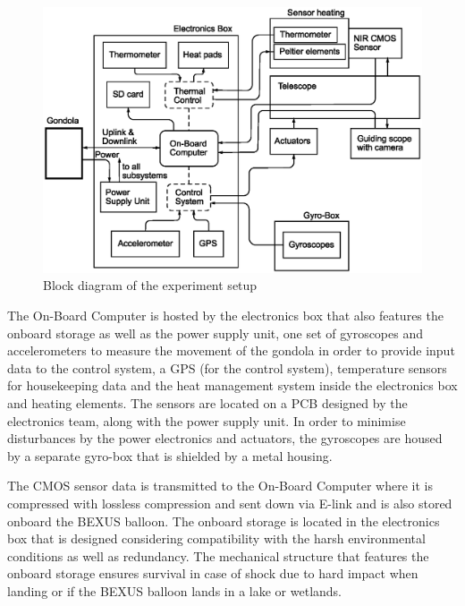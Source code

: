 \begin{figure}[htb]
	\centering
	\includegraphics[width = \linewidth]{4-experiment-design/img/setup/Block_diagram_4-1}
	\caption{Block diagram of the experiment setup}
	\label{fig::4-1_block_diagram}
\end{figure}

The On-Board Computer is hosted by the electronics box that also features the onboard storage as well as the power supply unit, one set of gyroscopes and accelerometers to measure the movement of the gondola in order to provide input data to the control system, a GPS (for the control system), temperature sensors for housekeeping data and the heat management system inside the electronics box and heating elements. The sensors are located on a PCB designed by the electronics team, along with the power supply unit. In order to minimise disturbances by the power electronics and actuators, the gyroscopes are housed by a separate gyro-box that is shielded by a metal housing.



The CMOS sensor data is transmitted to the On-Board Computer where it is compressed with lossless compression and sent down via E-link and is also stored onboard the BEXUS balloon. The onboard storage is located in the electronics box that is designed considering compatibility with the harsh environmental conditions as well as redundancy. The mechanical structure that features the onboard storage ensures survival in case of shock due to hard impact when landing or if the BEXUS balloon lands in a lake or wetlands.


